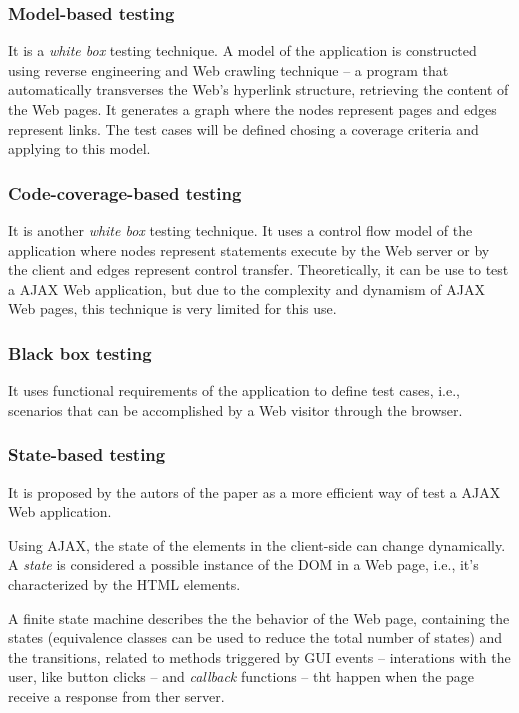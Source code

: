 \documentclass[a4paper, twocolumn]{ieee}
\begin{document}
\subsubsection{Model-based testing}

It is a \emph{white box} testing technique.
A model of the application is constructed using reverse engineering and Web crawling technique -- a program that automatically transverses the Web's hyperlink structure, retrieving the content of the Web pages.
It generates a graph where the nodes represent pages and edges represent links.
The test cases will be defined chosing a coverage criteria and applying to this model. 

\subsubsection{Code-coverage-based testing} 

It is another \emph{white box} testing technique. 
It uses a control flow model of the application where nodes represent statements execute by the Web server or by the client and edges represent control transfer.
Theoretically, it can be use to test a AJAX Web application, but due to the complexity and dynamism of AJAX Web pages, this technique is very limited for this use.

\subsubsection{Black box testing} 

It uses functional requirements of the application to define test cases, i.e., scenarios that can be accomplished by a Web visitor through the browser.

\subsubsection{State-based testing}

It is proposed by the autors of the paper as a more efficient way of test a AJAX Web application.

Using AJAX, the state of the elements in the client-side can change dynamically.
A \emph{state} is considered a possible instance of the DOM in a Web page, i.e., it's characterized by the HTML elements.

A finite state machine describes the the behavior of the Web page, containing the states (equivalence classes can be used to reduce the total number of states) and the transitions, related to methods triggered by GUI events -- interations with the user, like button clicks -- and \emph{callback} functions -- tht happen when the page receive a response from ther server.
\end{document}
